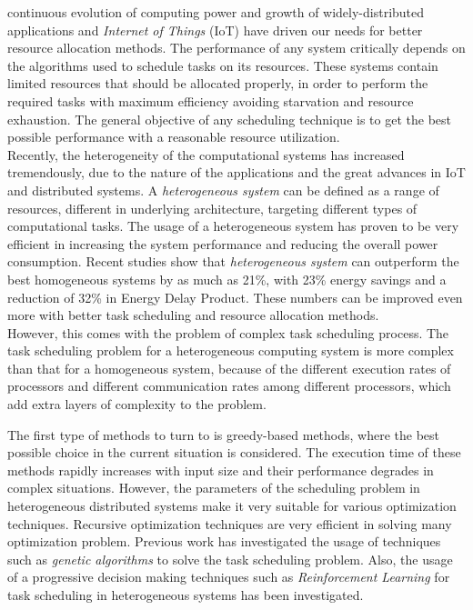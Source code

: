  continuous evolution of computing power and growth of widely-distributed applications and \emph{Internet of Things} (IoT) \cite{inproceedings} have driven our needs for better resource allocation methods. 
The performance of any system critically depends on the algorithms used to schedule tasks on its resources. These systems contain limited resources that should be allocated properly, in order to perform the required tasks with maximum efficiency avoiding starvation and resource exhaustion. 
The general objective of any scheduling technique is to get the best possible performance with a reasonable resource utilization. \\ 

Recently, the heterogeneity of the computational systems has increased tremendously, due to the nature of the applications and the great advances in IoT and distributed systems. A \emph{heterogeneous system} can be defined as a range of resources, different in underlying architecture, targeting different types of computational tasks. The usage of a heterogeneous system has proven to be very efficient in increasing the system performance and reducing the overall power consumption. Recent studies \cite{venkat2014harnessing} show that \emph{heterogeneous system} can outperform the best homogeneous systems by as much as 21\%, with 23\% energy savings and
a reduction of 32\% in Energy Delay Product. These numbers can be improved even more with better task scheduling and resource allocation methods. \\

However, this comes with the problem of complex task scheduling process. The task scheduling problem for a heterogeneous computing system is more complex than that for a homogeneous system, because of the different execution rates of processors and different communication rates among different processors, which add extra layers of complexity to the problem.

The first type of methods to turn to is greedy-based methods, where the best possible choice in the current situation is considered. The execution time of these methods rapidly increases with input size and their performance degrades in complex situations. However, the parameters of the scheduling problem in heterogeneous distributed systems make it very suitable for various optimization techniques. Recursive optimization techniques are very efficient in solving many optimization problem. Previous work has investigated the usage of techniques such as \emph{genetic algorithms} \cite{article2} to solve the task scheduling problem. Also, the usage of a progressive decision making techniques such as \emph{Reinforcement Learning} \cite{ORHEAN2018292} for task scheduling in heterogeneous systems has been investigated. \\

